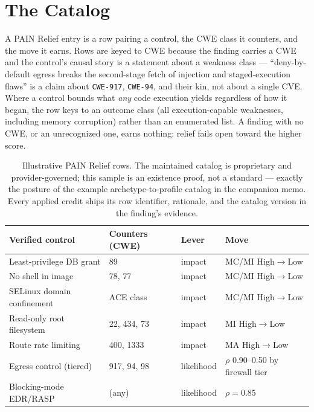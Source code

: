 \documentclass[11pt]{article}
\newcommand{\code}[1]{\texttt{#1}}
\begin{document}
\section{The Catalog}
\label{sec:catalog}
A PAIN Relief entry is a row pairing a control, the CWE class it counters, and
the move it earns. Rows are keyed to CWE because the finding carries a CWE and the
control's causal story is a statement about a weakness class --- ``deny-by-default
egress breaks the second-stage fetch of injection and staged-execution flaws''
is a claim about \code{CWE-917}, \code{CWE-94}, and their kin, not about a single
CVE. Where a control bounds what \emph{any} code execution yields regardless of
how it began, the row keys to an outcome class (all execution-capable weaknesses,
including memory corruption) rather than an enumerated list. A finding with no
CWE, or an unrecognized one, earns nothing: relief fails open toward the higher
score.

\begin{table}[H]
\centering
\renewcommand{\arraystretch}{1.25}
\footnotesize
\setlength{\tabcolsep}{5pt}
\begin{tabular}{l l l l}
\toprule
\textbf{Verified control} & \textbf{Counters (CWE)} & \textbf{Lever} & \textbf{Move} \\
\midrule
Least-privilege DB grant   & 89                & impact & MC/MI High$\to$Low \\
No shell in image          & 78, 77            & impact & MC/MI High$\to$Low \\
SELinux domain confinement & ACE class         & impact & MC/MI High$\to$Low \\
Read-only root filesystem  & 22, 434, 73       & impact & MI High$\to$Low \\
Route rate limiting        & 400, 1333         & impact & MA High$\to$Low \\
Egress control (tiered)    & 917, 94, 98       & likelihood & $\rho$ 0.90--0.50 by firewall tier \\
Blocking-mode EDR/RASP     & (any)             & likelihood & $\rho=0.85$ \\
\bottomrule
\end{tabular}
\caption{Illustrative PAIN Relief rows. The maintained catalog is proprietary and
provider-governed; this sample is an existence proof, not a standard --- exactly
the posture of the example archetype-to-profile catalog in the companion memo.
Every applied credit
ships its row identifier, rationale, and the catalog version in the finding's
evidence.}
\label{tab:catalog}
\end{table}
\end{document}

